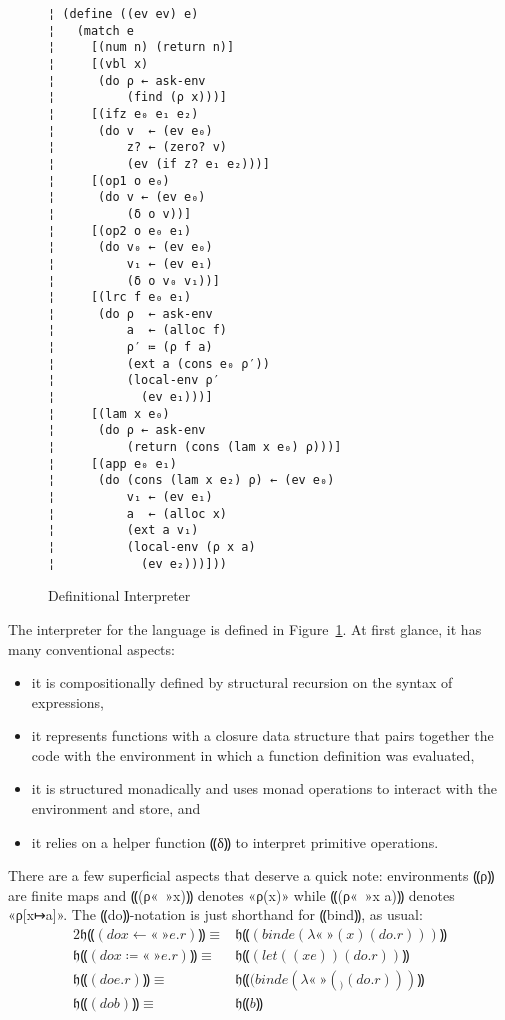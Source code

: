 \begin{figure}
\begin{lstlisting}
¦ (define ((ev ev) e)
¦   (match e
¦     [(num n) (return n)]
¦     [(vbl x)
¦      (do ρ ← ask-env
¦          (find (ρ x)))]    
¦     [(ifz e₀ e₁ e₂) 
¦      (do v  ← (ev e₀)
¦          z? ← (zero? v)
¦          (ev (if z? e₁ e₂)))]
¦     [(op1 o e₀)
¦      (do v ← (ev e₀)
¦          (δ o v))]   
¦     [(op2 o e₀ e₁)
¦      (do v₀ ← (ev e₀)
¦          v₁ ← (ev e₁)
¦          (δ o v₀ v₁))]
¦     [(lrc f e₀ e₁) 
¦      (do ρ  ← ask-env
¦          a  ← (alloc f)
¦          ρ′ ≔ (ρ f a)
¦          (ext a (cons e₀ ρ′))
¦          (local-env ρ′
¦            (ev e₁)))]
¦     [(lam x e₀)
¦      (do ρ ← ask-env
¦          (return (cons (lam x e₀) ρ)))]
¦     [(app e₀ e₁)
¦      (do (cons (lam x e₂) ρ) ← (ev e₀)
¦          v₁ ← (ev e₁)
¦          a  ← (alloc x)         
¦          (ext a v₁)
¦          (local-env (ρ x a) 
¦            (ev e₂)))]))
\end{lstlisting}
\caption{Definitional Interpreter}
\label{f:interpreter}
\end{figure}

The interpreter for the language is defined in Figure~\ref{f:interpreter}. At
first glance, it has many conventional aspects:
\begin{itemize}
\item it is compositionally defined by structural recursion on the syntax of
expressions,
\item it represents functions with a closure data structure that pairs together
the code with the environment in which a function definition was evaluated,
\item it is structured monadically and uses monad operations to interact with
the environment and store, and
\item it relies on a helper function ⸨δ⸩ to interpret primitive operations.
\end{itemize}

There are a few superficial aspects that deserve a quick note:
environments ⸨ρ⸩ are finite maps and ⸨(ρ«\ »x)⸩ denotes
«ρ(x)» while ⸨(ρ«\ »x a)⸩ denotes «ρ[x↦a]».  The
⸨do⸩-notation is just shorthand for ⸨bind⸩, as usual:
\begin{alignat*}{2}
   𝔥⸨(do x ←«\ »e . r)⸩ ≡ &\mathrel{} 𝔥⸨(bind e (λ«\ »(x) (do . r)))⸩
\\ 𝔥⸨(do x ≔«\ »e . r)⸩ ≡ &\mathrel{} 𝔥⸨(let ((x e)) (do . r))⸩
\\           𝔥⸨(do e . r)⸩ ≡ &\mathrel{} 𝔥⸨(bind e (λ«\ »(_) (do . r)))⸩
\\               𝔥⸨(do b)⸩ ≡ &\mathrel{} 𝔥⸨b⸩
\end{alignat*}

